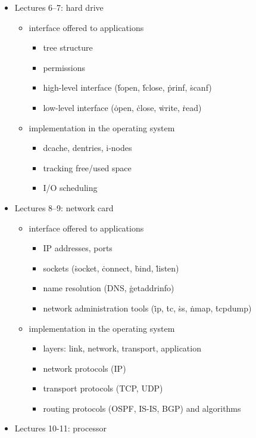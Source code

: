 \begin{itemize}
\item Lectures 6--7: hard drive
  \begin{itemize}
  \item interface offered to applications
    \begin{itemize}
    \item tree structure
    \item permissions
    \item high-level interface (\.{fopen}, \.{fclose}, \.{prinf}, \.{scanf})
    \item low-level interface (\.{open}, \.{close}, \.{write}, \.{read})
    \end{itemize}
  \item implementation in the operating system
    \begin{itemize}
    \item dcache, dentries, i-nodes
    \item tracking free/used space
    \item I/O scheduling
    \end{itemize}
  \end{itemize}
\item Lectures 8--9: network card
  \begin{itemize}
  \item interface offered to applications
    \begin{itemize}
    \item IP addresses, ports
    \item sockets (\.{socket}, \.{connect}, \.{bind}, \.{listen})
    \item name resolution (DNS, \.{getaddrinfo})
    \item network administration tools
      (\.{ip}, \.{tc}, \.{ss}, \.{nmap}, \.{tcpdump})
    \end{itemize}
  \item implementation in the operating system
    \begin{itemize}
    \item layers: link, network, transport, application
    \item network protocols (IP)
    \item transport protocols (TCP, UDP)
    \item routing protocols (OSPF, IS-IS, BGP) and algorithms
    \end{itemize}
  \end{itemize}
\item Lectures 10-11: processor
  \begin{itemize}

\end{itemize}
\end{itemize}
